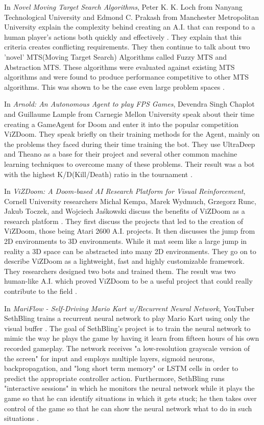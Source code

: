 In {\it Novel Moving Target Search Algorithms}, Peter K. K. Loch from Nanyang Technological University and Edmond C. Prakash from Manchester Metropolitan University explain the complexity behind creating an A.I. that can respond to a human player's actions both quickly and effectively \cite{Loh:2009}. They explain that this criteria creates conflicting requirements. They then continue to talk about two 'novel' MTS(Moving Target Search) Algorithms called Fuzzy MTS and Abstraction MTS. These algorithms were evaluated against existing MTS algorithms and were found to produce performance competitive to other MTS algorithms. This was shown to be the case even large problem spaces \cite{Loh:2009}.

In {\it Arnold: An Autonomous Agent to play FPS Games}, Devendra Singh Chaplot and Guillaume Lample from Carnegie Mellon University speak about their time creating a GameAgent for Doom and enter it into the popular competition ViZDoom. They speak briefly on their training methods for the Agent, mainly on the problems they faced during their time training the bot. They use UltraDeep and Theano as a base for their project and several other common machine learning techniques to overcome many of these problems. Their result was a bot with the highest K/D(Kill/Death) ratio in the tournament \cite{Chaplot}.

In {\it ViZDoom: A Doom-based AI Research Platform for Visual Reinforcement}, Cornell University researchers Michal Kempa, Marek Wydmuch, Grzegorz Runc, Jakub Toczek, and Wojciech Jaśkowski discuss the benefits of ViZDoom as a research platform \cite{Kempka:2016}. They first discuss the projects that led to the creation of ViZDoom, those being Atari 2600 A.I. projects. It then discusses the jump from 2D environments to 3D environments. While it mat seem like a large jump in reality a 3D space can be abstracted into many 2D environments. They go on to describe ViZDoom as a lightweight, fast and highly customizable framework. They researchers designed two bots and trained them. The result was two human-like A.I. which proved ViZDoom to be a useful project that could really contribute to the field \cite{Kempka:2016}.

In {\it MariFlow - Self-Driving Mario Kart w/Recurrent Neural Network}, YouTuber SethBling trains a recurrent neural network to play Mario Kart using only the visual buffer \cite{SethBling:2017}. The goal of SethBling's project is to train the neural network to mimic the way he plays the game by having it learn from fifteen hours of his own recorded gameplay. The network receives "a low-resolution grayscale version of the screen" for input and employs multiple layers, sigmoid neurons, backpropagation, and "long short term memory" or LSTM cells in order to predict the appropriate controller action. Furthermore, SethBling runs "interactive sessions" in which he monitors the neural network while it plays the game so that he can identify situations in which it gets stuck; he then takes over control of the game so that he can show the neural network what to do in such situations \cite{SethBling:2017}.

